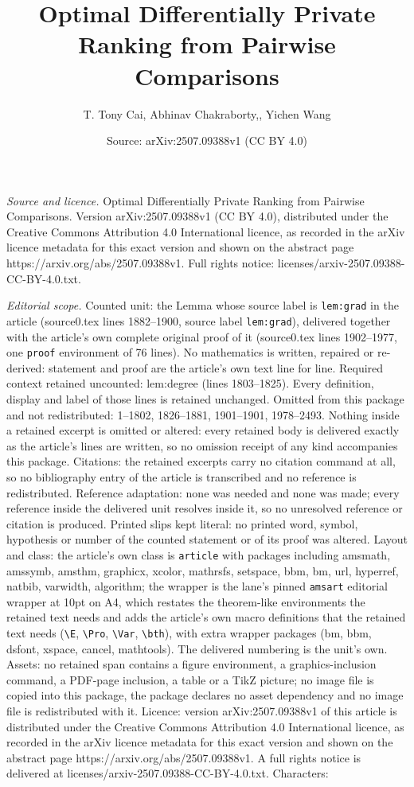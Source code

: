 \documentclass[10pt,a4paper]{amsart}
\title[Optimal Differentially Private Ranking from Pairwise Compari]{Optimal Differentially Private Ranking from Pairwise Comparisons}
\author{T. Tony Cai, Abhinav Chakraborty,, Yichen Wang}
\date{Source: arXiv:2507.09388v1 (CC BY 4.0)}
\begin{document}
\maketitle

\noindent\emph{Source and licence.} Optimal Differentially Private Ranking from Pairwise Comparisons. Version arXiv:2507.09388v1 (CC BY 4.0), distributed under the Creative Commons Attribution 4.0 International licence, as recorded in the arXiv licence metadata for this exact version and shown on the abstract page https://arxiv.org/abs/2507.09388v1. Full rights notice: licenses/arxiv-2507.09388-CC-BY-4.0.txt.\par\smallskip

\noindent\textit{Editorial scope.} Counted unit: the Lemma whose source label is \texttt{lem:grad} in the article (source0.tex lines 1882--1900, source label \texttt{lem:grad}), delivered together with the article's own complete original proof of it (source0.tex lines 1902--1977, one \texttt{proof} environment of 76 lines). No mathematics is written, repaired or re-derived: statement and proof are the article's own text line for line. Required context retained uncounted: lem:degree (lines 1803--1825). Every definition, display and label of those lines is retained unchanged. Omitted from this package and not redistributed: 1--1802, 1826--1881, 1901--1901, 1978--2493. Nothing inside a retained excerpt is omitted or altered: every retained body is delivered exactly as the article's lines are written, so no omission receipt of any kind accompanies this package. Citations: the retained excerpts carry no citation command at all, so no bibliography entry of the article is transcribed and no reference is redistributed. Reference adaptation: none was needed and none was made; every reference inside the delivered unit resolves inside it, so no unresolved reference or citation is produced. Printed slips kept literal: no printed word, symbol, hypothesis or number of the counted statement or of its proof was altered. Layout and class: the article's own class is \texttt{article} with packages including amsmath, amssymb, amsthm, graphicx, xcolor, mathrsfs, setspace, bbm, bm, url, hyperref, natbib, varwidth, algorithm; the wrapper is the lane's pinned \texttt{amsart} editorial wrapper at 10pt on A4, which restates the theorem-like environments the retained text needs and adds the article's own macro definitions that the retained text needs (\texttt{\textbackslash E}, \texttt{\textbackslash Pro}, \texttt{\textbackslash Var}, \texttt{\textbackslash bth}), with extra wrapper packages (bm, bbm, dsfont, xspace, cancel, mathtools). The delivered numbering is the unit's own. Assets: no retained span contains a figure environment, a graphics-inclusion command, a PDF-page inclusion, a table or a TikZ picture; no image file is copied into this package, the package declares no asset dependency and no image file is redistributed with it. Licence: version arXiv:2507.09388v1 of this article is distributed under the Creative Commons Attribution 4.0 International licence, as recorded in the arXiv licence metadata for this exact version and shown on the abstract page https://arxiv.org/abs/2507.09388v1. A full rights notice is delivered at licenses/arxiv-2507.09388-CC-BY-4.0.txt. Characters: 
\end{document}
